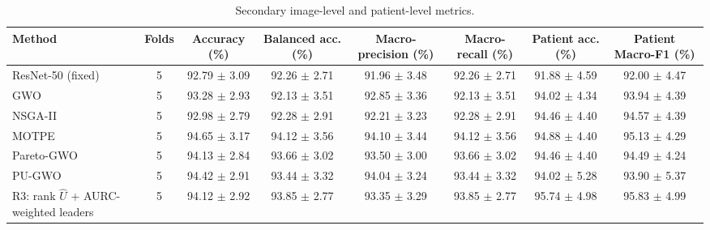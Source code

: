 \begin{table}[t]
\centering
\caption{Secondary image-level and patient-level metrics.}
\label{tab:table4_secondary_metrics}
\small
\begin{tabular}{lccccccc}
\toprule
Method & Folds & Accuracy (\%) & Balanced acc. (\%) & Macro-precision (\%) & Macro-recall (\%) & Patient acc. (\%) & Patient Macro-F1 (\%) \\
\midrule
ResNet-50 (fixed) & 5 & 92.79 $\pm$ 3.09 & 92.26 $\pm$ 2.71 & 91.96 $\pm$ 3.48 & 92.26 $\pm$ 2.71 & 91.88 $\pm$ 4.59 & 92.00 $\pm$ 4.47 \\
GWO & 5 & 93.28 $\pm$ 2.93 & 92.13 $\pm$ 3.51 & 92.85 $\pm$ 3.36 & 92.13 $\pm$ 3.51 & 94.02 $\pm$ 4.34 & 93.94 $\pm$ 4.39 \\
NSGA-II & 5 & 92.98 $\pm$ 2.79 & 92.28 $\pm$ 2.91 & 92.21 $\pm$ 3.23 & 92.28 $\pm$ 2.91 & 94.46 $\pm$ 4.40 & 94.57 $\pm$ 4.39 \\
MOTPE & 5 & 94.65 $\pm$ 3.17 & 94.12 $\pm$ 3.56 & 94.10 $\pm$ 3.44 & 94.12 $\pm$ 3.56 & 94.88 $\pm$ 4.40 & 95.13 $\pm$ 4.29 \\
Pareto-GWO & 5 & 94.13 $\pm$ 2.84 & 93.66 $\pm$ 3.02 & 93.50 $\pm$ 3.00 & 93.66 $\pm$ 3.02 & 94.46 $\pm$ 4.40 & 94.49 $\pm$ 4.24 \\
PU-GWO & 5 & 94.42 $\pm$ 2.91 & 93.44 $\pm$ 3.32 & 94.04 $\pm$ 3.24 & 93.44 $\pm$ 3.32 & 94.02 $\pm$ 5.28 & 93.90 $\pm$ 5.37 \\
R3: rank $\hat{U}$ + AURC-weighted leaders & 5 & 94.12 $\pm$ 2.92 & 93.85 $\pm$ 2.77 & 93.35 $\pm$ 3.29 & 93.85 $\pm$ 2.77 & 95.74 $\pm$ 4.98 & 95.83 $\pm$ 4.99 \\
\bottomrule
\end{tabular}
\end{table}
